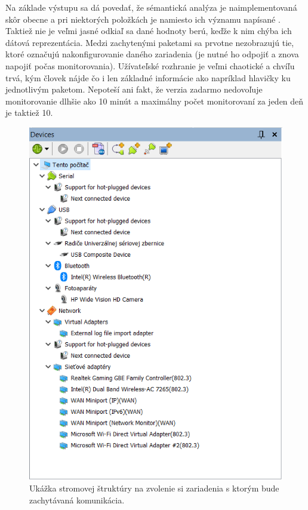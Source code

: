Na základe výstupu sa dá povedať, že sémantická analýza je naimplementovaná skôr obecne a pri niektorých položkách je namiesto ich významu napísané . Taktiež nie je veľmi jasné odkiaľ sa dané hodnoty berú, keďže k nim chýba ich dátová reprezentácia. Medzi zachytenými paketami sa prvotne nezobrazujú tie, ktoré označujú nakonfigurovanie daného zariadenia (je nutné ho odpojiť a znova napojiť počas monitorovania). Užívateľské rozhranie je veľmi chaotické a chvíľu trvá, kým človek nájde čo i len základné informácie ako napríklad hlavičky ku jednotlivým paketom.  Nepoteší ani fakt, že verzia zadarmo nedovoľuje monitorovanie dlhšie ako 10 minút a maximálny počet monitorovaní za jeden deň je taktiež 10.

\newpage

\begin{figure}[!htb]
	\centering
	\includegraphics[width=\textwidth]{img/uvod_treeview}
	\caption{Ukážka stromovej štruktúry na zvolenie si zariadenia s ktorým bude zachytávaná komunikácia.}
	\label{obr:uvod:treeview_foto}
\end{figure}

